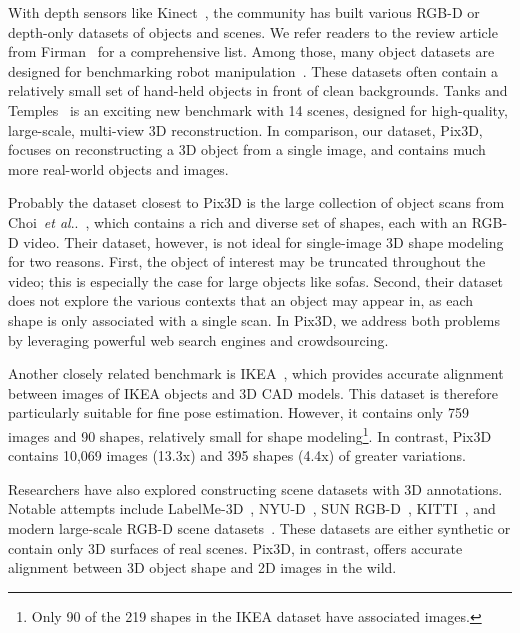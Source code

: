 \documentclass[10pt,twocolumn,letterpaper]{article}
\makeatletter
\DeclareRobustCommand\onedot{\futurelet\@let@token\@onedot}
\def\@onedot{\ifx\@let@token.\else.\null\fi\xspace}
\def\etal{\emph{et al}\onedot}
\newcommand{\data}{Pix3D\xspace}
\makeatother
\begin{document}
With depth sensors like Kinect~\cite{Izadi2011KinectFusion:,janoch2011category}, the community has built various RGB-D or depth-only datasets of objects and scenes. We refer readers to the review article from Firman~\cite{firman2016rgbd} for a comprehensive list. Among those, many object datasets are designed for benchmarking robot manipulation~\cite{calli2015benchmarking,hodan2017t,Lai2011large,singh2014bigbird}. These datasets often contain a relatively small set of hand-held objects in front of clean backgrounds. 
Tanks and Temples~\cite{knapitsch2017tanks} is an exciting new benchmark with 14 scenes, designed for high-quality, large-scale, multi-view 3D reconstruction. In comparison, our dataset, \data, focuses on reconstructing a 3D object from a single image, and contains much more real-world objects and images.

Probably the dataset closest to \data is the large collection of object scans from Choi~\etal~\cite{choi2016large}, which contains a rich and diverse set of shapes, each with an RGB-D video. Their dataset, however, is not ideal for single-image 3D shape modeling for two reasons. First, the object of interest may be truncated throughout the video; this is especially the case for large objects like sofas. 
Second, their dataset does not explore the various contexts that an object may appear in, as each shape is only associated with a single scan. In \data, we address both problems by leveraging powerful web search engines and crowdsourcing. 

Another closely related benchmark is IKEA~\cite{Lim2013Parsing}, which provides accurate alignment between images of IKEA objects and 3D CAD models. This dataset is therefore particularly suitable for fine pose estimation. However, it contains only 759 images and 90 shapes, relatively small for shape modeling\footnote{Only 90 of the 219 shapes in the IKEA dataset have associated images.}. In contrast, \data contains 10,069 images (13.3x) and 395 shapes (4.4x) of greater variations. 

Researchers have also explored constructing scene datasets with 3D annotations. Notable attempts include LabelMe-3D~\cite{russell2009building}, NYU-D~\cite{Silberman2012Indoor}, SUN RGB-D~\cite{song2015sun}, KITTI~\cite{geiger2012we}, and modern large-scale RGB-D scene datasets~\cite{dai2017scannet,McCormac2017SceneNet,Song2017Semantic}. These datasets are either synthetic or contain only 3D surfaces of real scenes. \data, in contrast, offers accurate alignment between 3D object shape and 2D images in the wild.
\end{document}
